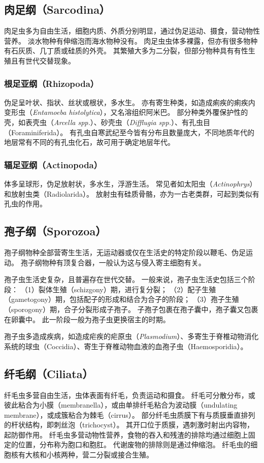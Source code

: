 \documentclass[11pt]{article}
\begin{document}
\subsection{肉足纲（Sarcodina）}
肉足虫多为自由生活，细胞内质、外质分别明显，通过伪足运动、摄食，营动物性营养。
淡水物种有伸缩泡而海水物种没有。
肉足虫虫体多裸露，但亦有很多物种有石灰质、几丁质或硅质的外壳。
其繁殖大多为二分裂，但部分物种具有有性生殖且有世代交替现象。

\subsubsection{根足亚纲（Rhizopoda）}
伪足呈叶状、指状、丝状或根状，多水生。
亦有寄生种类，如造成痢疾的痢疾内变形虫（\textit{Entamoeba histolytica}），又名溶组织阿米巴。
部分种类外覆保护性的壳，如表壳虫（\textit{Arcella spp.}）、砂壳虫（\textit{Difflugia spp.}）、有孔虫目（Foraminiferida）。
有孔虫自寒武纪至今皆有分布且数量庞大，不同地质年代的地层常有不同的有孔虫化石，故可用于确定地层年代。

\subsubsection{辐足亚纲（Actinopoda）}
体多呈球形，伪足放射状，多水生，浮游生活。
常见者如太阳虫（\textit{Actinophrys}）和放射虫类（Radiolarida）。
放射虫有硅质骨骼，亦为一古老类群，可起到类似有孔虫的作用。

\subsection{孢子纲（Sporozoa）}
孢子纲物种全部营寄生生活，无运动器或仅在生活史的特定阶段以鞭毛、伪足运动。
孢子纲物种有顶复合器，一般认为这与侵入寄主细胞有关。

\newline

孢子虫生活史复杂，且普遍存在世代交替。
一般来说，孢子虫生活史包括三个阶段：
（1）裂体生殖（schizgony）期，进行复分裂；
（2）配子生殖（gametogony）期，包括配子的形成和结合为合子的阶段；
（3）孢子生殖（sporogony）期，合子分裂形成子孢子。
子孢子包裹在孢子囊中，孢子囊又包裹在卵囊中。
此一阶段一般为孢子虫更换宿主的时期。

\newline

孢子虫多造成疾病，如造成疟疾的疟原虫（\textit{Plasmodium}）、多寄生于脊椎动物消化系统的球虫（Coccidia）、寄生于脊椎动物血液的血孢子虫（Haemosporidia）。

\subsection{纤毛纲（Ciliata）}
纤毛虫多营自由生活，虫体表面有纤毛，负责运动和摄食。
纤毛可分散分布，或彼此粘合为小膜（membranella），或由单排纤毛粘合为波动膜（undulating membrane），或成簇粘合为棘毛（cirrus）。
部分纤毛虫质膜下有与质膜垂直排列的杆状结构，即刺丝泡（trichocyst）。
其开口位于质膜，遇刺激时射出内容物，起防御作用。
纤毛虫多营动物性营养，食物的吞入和残渣的排除均通过细胞上固定的位置，分布称为胞口和胞肛。
代谢废物的排除则是通过伸缩泡。
纤毛虫的细胞核有大核和小核两种，营二分裂或接合生殖。
\end{document}
